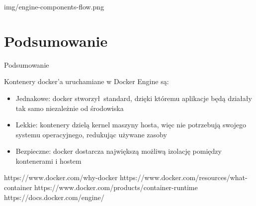 \documentclass[aspectratio=169]{beamer}
\begin{document}
\begin{frameImg}[\textwidth]{img/engine-components-flow.png}
\end{frameImg}

\section{Podsumowanie}
\begin{frame}{Podsumowanie}
    \begin{card}
        Kontenery docker'a uruchamiane w Docker Engine są:
        \begin{itemize}
            \item Jednakowe: docker stworzył standard, dzięki któremu aplikacje będą działały tak samo niezależnie od środowiska
            \item Lekkie: kontenery dzielą kernel maszyny hosta, więc nie potrzebują swojego systemu operacyjnego, redukując używane zasoby
            \item Bezpieczne: docker dostarcza największą możliwą izolację pomiędzy kontenerami i hostem
        \end{itemize}
    \end{card}
\end{frame}



https://www.docker.com/why-docker
https://www.docker.com/resources/what-container
https://www.docker.com/products/container-runtime
https://docs.docker.com/engine/
\end{document}
